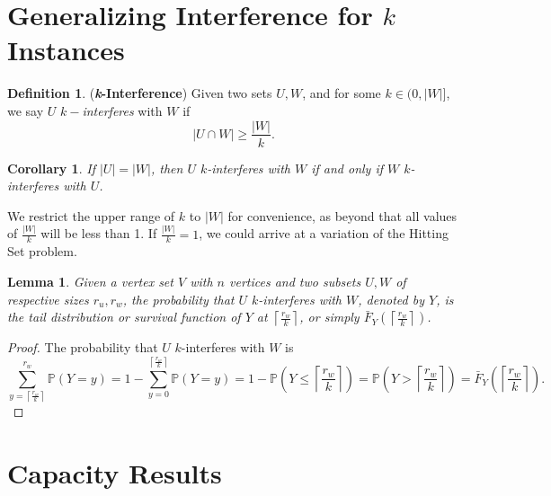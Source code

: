 \documentclass[10pt]{extarticle}
\newtheorem{lemma}[theorem]{Lemma}
\newtheorem{corollary}[theorem]{Corollary}
\theoremstyle{definition}
\newtheorem{definition}[theorem]{Definition}
\begin{document}
\section{Generalizing Interference for $k$ Instances}

\begin{definition}
    (\textbf{\textit{k}-Interference}) Given two sets $U, W$, and for some $k \in (0,|W|]$, we say $U$ $k-$\textit{interferes} with $W$ if 
    \begin{equation}
        |U \cap W| \ge  \frac{|W|}{k}.
    \end{equation}
\end{definition}

\begin{corollary}
\label{collorary:k-int-equals}
    If $|U| = |W|$, then $U$ $k$-interferes with $W$ if and only if $W$ $k$-interferes with $U$.
\end{corollary}

We restrict the upper range of $k$ to $|W|$ for convenience, as beyond that all values of $\frac{|W|}{k}$ will be less than 1. If $\frac{|W|}{k} = 1$, we could arrive at a variation of the Hitting Set problem. 


\begin{lemma}
\label{lemma:k-int-prob}
    Given a vertex set $V$ with $n$ vertices and two subsets $U,W$ of respective sizes $r_u,r_w$, the probability that $U$ $k$-interferes with $W$, denoted by $Y$, is the tail distribution or survival function of $Y$ at $\left\lceil \frac{r_w}{k} \right\rceil$, or simply $\bar{F}_Y\left(\left\lceil \frac{r_w}{k} \right\rceil\right)$.
\end{lemma}
\begin{proof}
    
    The probability that $U$ $k$-interferes with $W$ is 
    \begin{equation}
        \sum_{y = \left\lceil \frac{r_w}{k} \right\rceil}^{r_w} \mathbb{P}(Y=y) = 1 - \sum_{y = 0}^{\left\lceil \frac{r_w}{k} \right\rceil} \mathbb{P}(Y=y) = 1 - \mathbb{P}\left(Y\leq \left\lceil \frac{r_w}{k} \right\rceil\right) = \mathbb{P}\left(Y > \left\lceil \frac{r_w}{k} \right\rceil\right) = \bar{F}_Y\left(\left\lceil \frac{r_w}{k} \right\rceil\right).
    \end{equation}
\end{proof}

\section{Capacity Results}
\end{document}
